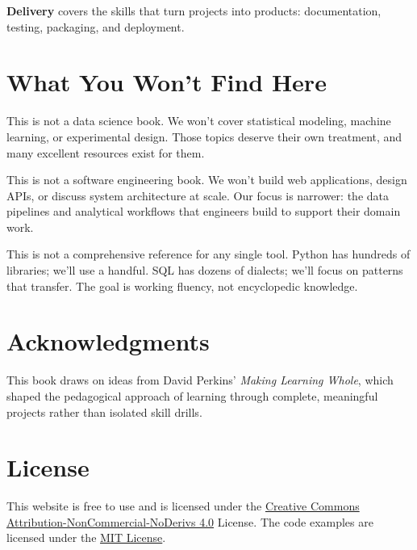 \documentclass[
  letterpaper,
  DIV=11,
  numbers=noendperiod]{scrreprt}
\begin{document}
\textbf{Delivery} covers the skills that turn projects into products:
documentation, testing, packaging, and deployment.

\section*{What You Won't Find Here}\label{what-you-wont-find-here}


This is not a data science book. We won't cover statistical modeling,
machine learning, or experimental design. Those topics deserve their own
treatment, and many excellent resources exist for them.

This is not a software engineering book. We won't build web
applications, design APIs, or discuss system architecture at scale. Our
focus is narrower: the data pipelines and analytical workflows that
engineers build to support their domain work.

This is not a comprehensive reference for any single tool. Python has
hundreds of libraries; we'll use a handful. SQL has dozens of dialects;
we'll focus on patterns that transfer. The goal is working fluency, not
encyclopedic knowledge.

\section*{Acknowledgments}\label{acknowledgments}


This book draws on ideas from David Perkins' \emph{Making Learning
Whole}, which shaped the pedagogical approach of learning through
complete, meaningful projects rather than isolated skill drills.

\section*{License}\label{license}


This website is free to use and is licensed under the
\href{https://creativecommons.org/licenses/by-nc-nd/4.0/}{Creative
Commons Attribution-NonCommercial-NoDerivs 4.0} License. The code
examples are licensed under the
\href{https://opensource.org/license/mit}{MIT License}.
\end{document}
